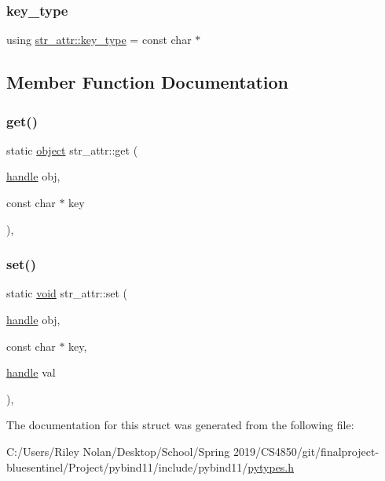 \subsubsection{\texorpdfstring{key\_type}{key\_type}}
{\footnotesize\ttfamily using \mbox{\hyperlink{structstr__attr_ac6715dfd0dc3e39e4ee71f2eed8939b7}{str\+\_\+attr\+::key\+\_\+type}} =  const char $\ast$}



\subsection{Member Function Documentation}
\mbox{\label{structstr__attr_aba6a5f0515f28d5f3ff827559ac3446b}} 
\subsubsection{\texorpdfstring{get()}{get()}}
{\footnotesize\ttfamily static \mbox{\hyperlink{classobject}{object}} str\+\_\+attr\+::get (\begin{DoxyParamCaption}\item[{\mbox{\hyperlink{classhandle}{handle}}}]{obj,  }\item[{const char $\ast$}]{key }\end{DoxyParamCaption})\hspace{0.3cm}{\ttfamily [inline]}, {\ttfamily [static]}}

\mbox{\label{structstr__attr_a547cb1910803f5a385d742f0a7dc7b78}} 
\subsubsection{\texorpdfstring{set()}{set()}}
{\footnotesize\ttfamily static \mbox{\hyperlink{_s_d_l__opengles2__gl2ext_8h_ae5d8fa23ad07c48bb609509eae494c95}{void}} str\+\_\+attr\+::set (\begin{DoxyParamCaption}\item[{\mbox{\hyperlink{classhandle}{handle}}}]{obj,  }\item[{const char $\ast$}]{key,  }\item[{\mbox{\hyperlink{classhandle}{handle}}}]{val }\end{DoxyParamCaption})\hspace{0.3cm}{\ttfamily [inline]}, {\ttfamily [static]}}



The documentation for this struct was generated from the following file\+:\begin{DoxyCompactItemize}
\item 
C\+:/\+Users/\+Riley Nolan/\+Desktop/\+School/\+Spring 2019/\+C\+S4850/git/finalproject-\/bluesentinel/\+Project/pybind11/include/pybind11/\mbox{\hyperlink{pytypes_8h}{pytypes.\+h}}\end{DoxyCompactItemize}
